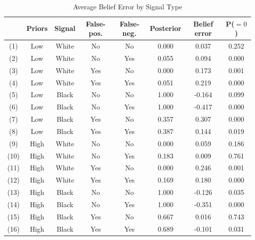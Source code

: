 \begin{table}[H]\centering \caption{Average Belief Error by Signal Type} \begin{tabular}{cccccccc} \hline \hline
 &\textbf{Priors}&\textbf{Signal}&\textbf{False-pos.}&\textbf{False-neg.}&\textbf{Posterior}&\textbf{Belief error}& \textbf{P($=0$)}\\ \hline
(1)&Low&White&No&No&0.000&0.037&0.252\\
(2)&Low&White&No&Yes&0.055&0.094&0.000\\
(3)&Low&White&Yes&No&0.000&0.173&0.001\\
(4)&Low&White&Yes&Yes&0.051&0.219&0.000\\
(5)&Low&Black&No&No&1.000&-0.164&0.099\\
(6)&Low&Black&No&Yes&1.000&-0.417&0.000\\
(7)&Low&Black&Yes&No&0.357&0.307&0.000\\
(8)&Low&Black&Yes&Yes&0.387&0.144&0.019\\
(9)&High&White&No&No&0.000&0.059&0.186\\
(10)&High&White&No&Yes&0.183&0.009&0.761\\
(11)&High&White&Yes&No&0.000&0.246&0.001\\
(12)&High&White&Yes&Yes&0.169&0.180&0.000\\
(13)&High&Black&No&No&1.000&-0.126&0.035\\
(14)&High&Black&No&Yes&1.000&-0.351&0.000\\
(15)&High&Black&Yes&No&0.667&0.016&0.743\\
(16)&High&Black&Yes&Yes&0.689&-0.101&0.031\\
\hline \end{tabular} \end{table}
